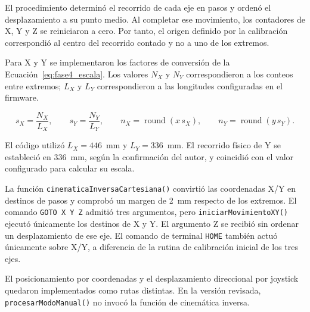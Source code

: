 El procedimiento determinó el recorrido de cada eje en pasos y ordenó el desplazamiento a su punto medio. Al completar ese movimiento, los contadores de X, Y y Z se reiniciaron a cero. Por tanto, el origen definido por la calibración correspondió al centro del recorrido contado y no a uno de los extremos.

Para X y Y se implementaron los factores de conversión de la Ecuación~\ref{eq:fase4_escala}. Los valores $N_X$ y $N_Y$ correspondieron a los conteos entre extremos; $L_X$ y $L_Y$ correspondieron a las longitudes configuradas en el firmware.

\begin{equation}
    s_X=\frac{N_X}{L_X},\qquad s_Y=\frac{N_Y}{L_Y},\qquad
    n_X=\operatorname{round}(x\,s_X),\qquad
    n_Y=\operatorname{round}(y\,s_Y).
    \label{eq:fase4_escala}
\end{equation}

El código utilizó $L_X=446$~mm y $L_Y=336$~mm. El recorrido físico de Y se estableció en 336~mm, según la confirmación del autor, y coincidió con el valor configurado para calcular su escala.

La función \texttt{cinematicaInversaCartesiana()} convirtió las coordenadas X/Y en destinos de pasos y comprobó un margen de 2~mm respecto de los extremos. El comando \texttt{GOTO X Y Z} admitió tres argumentos, pero \texttt{iniciarMovimientoXY()} ejecutó únicamente los destinos de X y Y. El argumento Z se recibió sin ordenar un desplazamiento de ese eje. El comando de terminal \texttt{HOME} también actuó únicamente sobre X/Y, a diferencia de la rutina de calibración inicial de los tres ejes.

El posicionamiento por coordenadas y el desplazamiento direccional por joystick quedaron implementados como rutas distintas. En la versión revisada, \texttt{procesarModoManual()} no invocó la función de cinemática inversa.
